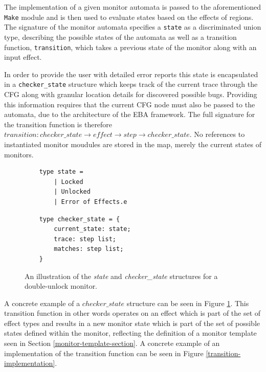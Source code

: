 \newpar The implementation of a given monitor automata is passed to the aforementioned \texttt{Make} module and is then used to evaluate states based on the effects of regions. The signature of the monitor automata specifies a \texttt{state} as a discriminated union type, describing the possible states of the automata as well as a transition function, \texttt{transition}, which takes a previous state of the monitor along with an input effect. 

\newpar In order to provide the user with detailed error reports this state is encapsulated in a \texttt{checker\_state} structure which keeps track of the current trace through the CFG along with granular location details for discovered possible bugs. Providing this information requires that the current CFG node must also be passed to the automata, due to the architecture of the EBA framework. The full signature for the transition function is therefore $transition: \mathit{checker\_state} \rightarrow \mathit{effect} \rightarrow \mathit{step} \rightarrow \mathit{checker\_state}$. No references to instantiated monitor moudules are stored in the map, merely the current states of monitors. 

\begin{figure}[H]
    \centering
    \begin{minipage}[t]{0.45\textwidth}
    \begin{verbatim}
    type state = 
        | Locked
        | Unlocked
        | Error of Effects.e
    \end{verbatim}
    \end{minipage}
    \hspace*{0.05\textwidth}
    \begin{minipage}[t]{0.45\textwidth}
    \begin{verbatim}
    type checker_state = {
        current_state: state;
        trace: step list;
        matches: step list;
    }
    \end{verbatim}
    \end{minipage}
    \caption{An illustration of the \textit{state} and \textit{checker\_state} structures for a double-unlock monitor.}
    \label{checker-state}
    \end{figure}

\newpar A concrete example of a $checker\_state$ structure can be seen in Figure \ref{checker-state}. This transition function in other words operates on an effect which is part of the set of effect types and results in a new monitor state which is part of the set of possible states defined within the monitor, reflecting the definition of a monitor template seen in Section \ref{monitor-template-section}. A concrete example of an implementation of the transition function can be seen in Figure \ref{transition-implementation}. 

